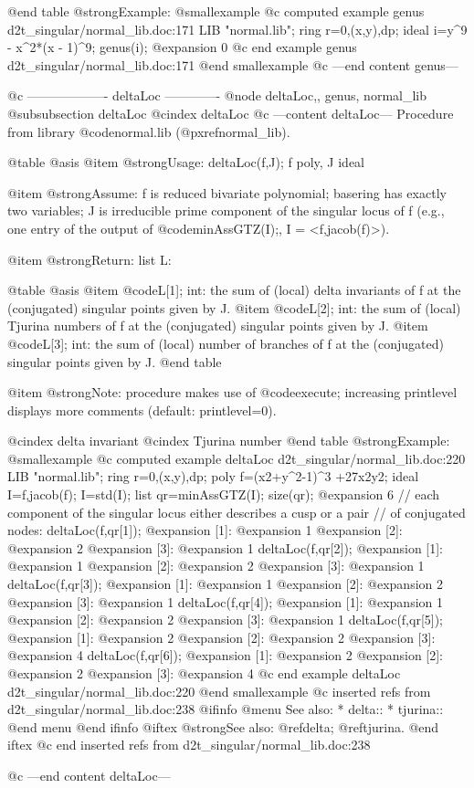 @end table
@strong{Example:}
@smallexample
@c computed example genus d2t_singular/normal_lib.doc:171 
LIB "normal.lib";
ring r=0,(x,y),dp;
ideal i=y^9 - x^2*(x - 1)^9;
genus(i);
@expansion{} 0
@c end example genus d2t_singular/normal_lib.doc:171
@end smallexample
@c ---end content genus---

@c ------------------- deltaLoc -------------
@node deltaLoc,, genus, normal_lib
@subsubsection deltaLoc
@cindex deltaLoc
@c ---content deltaLoc---
Procedure from library @code{normal.lib} (@pxref{normal_lib}).

@table @asis
@item @strong{Usage:}
deltaLoc(f,J); f poly, J ideal

@item @strong{Assume:}
f is reduced bivariate polynomial; basering has exactly two variables;
J is irreducible prime component of the singular locus of f (e.g., one
entry of the output of @code{minAssGTZ(I);}, I = <f,jacob(f)>).

@item @strong{Return:}
list L:

@table @asis
@item @code{L[1]}; int:
         the sum of (local) delta invariants of f at the (conjugated) singular
         points given by J.
@item @code{L[2]}; int:
         the sum of (local) Tjurina numbers of f at the (conjugated) singular
         points given by J.
@item @code{L[3]}; int:
         the sum of (local) number of branches of f at the (conjugated) 
         singular points given by J.
@end table

@item @strong{Note:}
procedure makes use of @code{execute}; increasing printlevel displays
more comments (default: printlevel=0).

@cindex delta invariant
@cindex Tjurina number
@end table
@strong{Example:}
@smallexample
@c computed example deltaLoc d2t_singular/normal_lib.doc:220 
LIB "normal.lib";
ring r=0,(x,y),dp;
poly f=(x2+y^2-1)^3 +27x2y2;
ideal I=f,jacob(f);
I=std(I);
list qr=minAssGTZ(I);
size(qr);
@expansion{} 6
// each component of the singular locus either describes a cusp or a pair
// of conjugated nodes:
deltaLoc(f,qr[1]); 
@expansion{} [1]:
@expansion{}    1
@expansion{} [2]:
@expansion{}    2
@expansion{} [3]:
@expansion{}    1
deltaLoc(f,qr[2]); 
@expansion{} [1]:
@expansion{}    1
@expansion{} [2]:
@expansion{}    2
@expansion{} [3]:
@expansion{}    1
deltaLoc(f,qr[3]); 
@expansion{} [1]:
@expansion{}    1
@expansion{} [2]:
@expansion{}    2
@expansion{} [3]:
@expansion{}    1
deltaLoc(f,qr[4]); 
@expansion{} [1]:
@expansion{}    1
@expansion{} [2]:
@expansion{}    2
@expansion{} [3]:
@expansion{}    1
deltaLoc(f,qr[5]); 
@expansion{} [1]:
@expansion{}    2
@expansion{} [2]:
@expansion{}    2
@expansion{} [3]:
@expansion{}    4
deltaLoc(f,qr[6]);
@expansion{} [1]:
@expansion{}    2
@expansion{} [2]:
@expansion{}    2
@expansion{} [3]:
@expansion{}    4
@c end example deltaLoc d2t_singular/normal_lib.doc:220
@end smallexample
@c inserted refs from d2t_singular/normal_lib.doc:238
@ifinfo
@menu
See also:
* delta::
* tjurina::
@end menu
@end ifinfo
@iftex
@strong{See also:}
@ref{delta};
@ref{tjurina}.
@end iftex
@c end inserted refs from d2t_singular/normal_lib.doc:238

@c ---end content deltaLoc---
